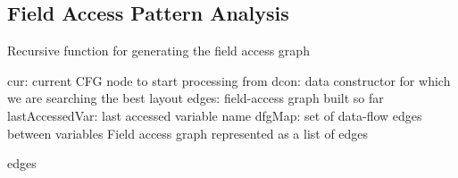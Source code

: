 \documentclass[acmsmall,review,anonymous]{acmart}\settopmatter{printfolios=true,printccs=false,printacmref=false}
\providecommand{\DIFaddtex}[1]{{\protect\color{blue} \sf #1}} %
\providecommand{\DIFaddbegin}{} %
\providecommand{\DIFadd}[1]{\texorpdfstring{\DIFaddtex{#1}}{#1}} %
\newcommand{\DIFaddincludegraphics}[2][]{{\color{blue}\fbox{\DIFOincludegraphics[#1]{#2}}}} %
\DeclareRobustCommand{\DIFaddbegin}{\DIFOaddbegin \let\includegraphics\DIFaddincludegraphics} %
\begin{document}
\subsection{Field Access Pattern Analysis}
\label{design:fieldgraph}

\DIFaddbegin \begin{algorithm}[t]
        \caption{\DIFadd{Recursive function for generating the field access graph}}\label{alg:field-access-graph}
        \begin{algorithmic}[1]
            \small
            \Input
                \State \DIFadd{cur: current CFG node to start processing from
                }\State \DIFadd{dcon: data constructor for which we are searching the best layout
                }\State \DIFadd{edges: field-access graph built so far
                }\State \DIFadd{lastAccessedVar: last accessed variable name
                }\State \DIFadd{dfgMap: set of data-flow edges between variables
            }\EndInput
            \Output
                \State \DIFadd{Field access graph represented as a list of edges
}\EndOutput

                 \label{line-likelihood-example}
                 \label{line:lastAccessedVar-start}
                     \label{line:boundInDcon}
						\Continue
					\EndIf
							  \label{line:cfg-edge}
                                  \label{line:dfg-edge}
                            \EndIf
\EndIf
                \EndFor \label{line:lastAccessedVar-end}

                 \label{line:succ-rec-start}
                \EndFor \label{line:succ-rec-end}

                \State \Return \DIFadd{edges\textquotesingle
}

            \EndFunction





\end{algorithmic}
    \end{algorithm}
\end{document}
